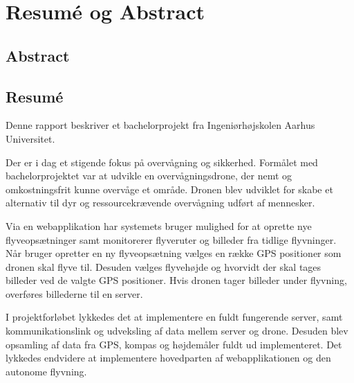 \chapter{Resumé og Abstract}
\label{chap:resume}


\section*{Abstract}


\section*{Resumé}

Denne rapport beskriver et bachelorprojekt fra Ingeniørhøjskolen Aarhus Universitet.

Der er i dag et stigende fokus på overvågning og sikkerhed. Formålet med bachelorprojektet var at udvikle en overvågningsdrone, der nemt og omkostningsfrit kunne overvåge et område. Dronen blev udviklet for skabe et alternativ til dyr og ressourcekrævende overvågning udført af mennesker. 

Via en webapplikation har systemets bruger mulighed for at oprette nye flyveopsætninger samt monitorerer flyveruter og billeder fra tidlige flyvninger. Når bruger opretter en ny flyveopsætning vælges en række GPS positioner som dronen skal flyve til. Desuden vælges flyvehøjde og hvorvidt der skal tages billeder ved de valgte GPS positioner. Hvis dronen tager billeder under flyvning, overføres billederne til en server.

I projektforløbet lykkedes det at implementere en fuldt fungerende server, samt kommunikationslink og udveksling af data mellem server og drone. Desuden blev opsamling af data fra GPS, kompas og højdemåler fuldt ud implementeret. Det lykkedes endvidere at implementere hovedparten af webapplikationen og den autonome flyvning. 





